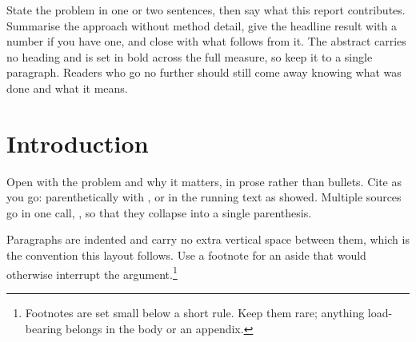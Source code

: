\documentclass{daimreport}
\begin{document}
\makedaimtitle

\begin{daimabstract}
State the problem in one or two sentences, then say what this report
contributes. Summarise the approach without method detail, give the headline
result with a number if you have one, and close with what follows from it. The
abstract carries no heading and is set in bold across the full measure, so keep
it to a single paragraph. Readers who go no further should still come away
knowing what was done and what it means.
\end{daimabstract}


%

\section{Introduction}

Open with the problem and why it matters, in prose rather than bullets. Cite as
you go: parenthetically with \citep{placeholder-article}, or in the running text
as \citet{placeholder-book} showed. Multiple sources go in one call,
\citep{placeholder-article,placeholder-inproceedings}, so that they collapse
into a single parenthesis.

Paragraphs are indented and carry no extra vertical space between them, which is
the convention this layout follows. Use a footnote for an aside that would
otherwise interrupt the argument.\footnote{Footnotes are set small below a short
rule. Keep them rare; anything load-bearing belongs in the body or an appendix.}
\end{document}
